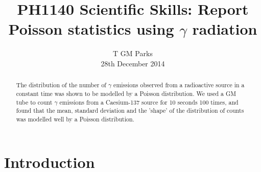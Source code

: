 \documentclass[10pt]{iopart}
\begin{document}
\title[PH1140 Report - T GM Parks]{PH1140 Scientific Skills: Report Poisson statistics using $\gamma$ radiation}

\author{T GM Parks\\28th December 2014}

\begin{abstract}
The distribution of the number of $\gamma$ emissions observed from a radioactive source in a constant time was shown to be modelled by a Poisson distribution. We used a GM tube to count $\gamma$ emissions from a Caesium-137 source for 10 seconds 100 times, and found that the mean, standard deviation and the 'shape' of the distribution of counts was modelled well by a Poisson distribution.
\end{abstract}


\section{Introduction}
\end{document}
